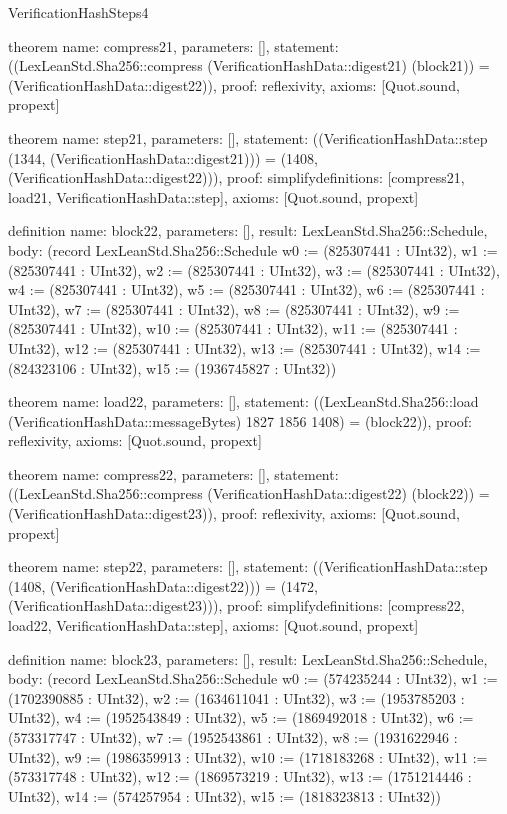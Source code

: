 \begin{lexlean}{VerificationHashSteps4}
\begin{semanticmodule}
theorem{
  name: compress21,
  parameters: [],
  statement: ((LexLeanStd.Sha256::compress (VerificationHashData::digest21) (block21)) = (VerificationHashData::digest22)),
  proof: reflexivity{},
  axioms: [Quot.sound, propext]
}

theorem{
  name: step21,
  parameters: [],
  statement: ((VerificationHashData::step (1344, (VerificationHashData::digest21))) = (1408, (VerificationHashData::digest22))),
  proof: simplify{definitions: [compress21, load21, VerificationHashData::step]},
  axioms: [Quot.sound, propext]
}

definition{
  name: block22,
  parameters: [],
  result: LexLeanStd.Sha256::Schedule,
  body: (record LexLeanStd.Sha256::Schedule {w0 := (825307441 : UInt32), w1 := (825307441 : UInt32), w2 := (825307441 : UInt32), w3 := (825307441 : UInt32), w4 := (825307441 : UInt32), w5 := (825307441 : UInt32), w6 := (825307441 : UInt32), w7 := (825307441 : UInt32), w8 := (825307441 : UInt32), w9 := (825307441 : UInt32), w10 := (825307441 : UInt32), w11 := (825307441 : UInt32), w12 := (825307441 : UInt32), w13 := (825307441 : UInt32), w14 := (824323106 : UInt32), w15 := (1936745827 : UInt32)})
}

theorem{
  name: load22,
  parameters: [],
  statement: ((LexLeanStd.Sha256::load (VerificationHashData::messageBytes) 1827 1856 1408) = (block22)),
  proof: reflexivity{},
  axioms: [Quot.sound, propext]
}

theorem{
  name: compress22,
  parameters: [],
  statement: ((LexLeanStd.Sha256::compress (VerificationHashData::digest22) (block22)) = (VerificationHashData::digest23)),
  proof: reflexivity{},
  axioms: [Quot.sound, propext]
}

theorem{
  name: step22,
  parameters: [],
  statement: ((VerificationHashData::step (1408, (VerificationHashData::digest22))) = (1472, (VerificationHashData::digest23))),
  proof: simplify{definitions: [compress22, load22, VerificationHashData::step]},
  axioms: [Quot.sound, propext]
}

definition{
  name: block23,
  parameters: [],
  result: LexLeanStd.Sha256::Schedule,
  body: (record LexLeanStd.Sha256::Schedule {w0 := (574235244 : UInt32), w1 := (1702390885 : UInt32), w2 := (1634611041 : UInt32), w3 := (1953785203 : UInt32), w4 := (1952543849 : UInt32), w5 := (1869492018 : UInt32), w6 := (573317747 : UInt32), w7 := (1952543861 : UInt32), w8 := (1931622946 : UInt32), w9 := (1986359913 : UInt32), w10 := (1718183268 : UInt32), w11 := (573317748 : UInt32), w12 := (1869573219 : UInt32), w13 := (1751214446 : UInt32), w14 := (574257954 : UInt32), w15 := (1818323813 : UInt32)})
}


\end{semanticmodule}
\end{lexlean}

